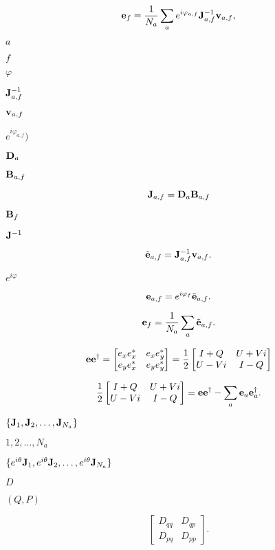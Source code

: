 \documentclass{article}
\begin{document}
\[ {\bf e}_f = \frac{1}{N_a} \sum_a e^{i\varphi_{a,f}} {\bf J}_{a,f}^{-1} {\bf v}_{a,f}, \]
\pagebreak

$a$
\pagebreak

$f$
\pagebreak

$\varphi$
\pagebreak

${\bf J}_{a,f}^{-1}$
\pagebreak

${\bf v}_{a,f}$
\pagebreak

$e^{i\varphi_{a,f}})$
\pagebreak

${\bf D}_a$
\pagebreak

${\bf B}_{a,f}$
\pagebreak

\[ {\bf J}_{a,f} = {\bf D}_a {\bf B}_{a,f} \]
\pagebreak

${\bf B}_f$
\pagebreak

${\bf J}^{-1}$
\pagebreak

\[ \tilde{\bf e}_{a,f} = {\bf J}^{-1}_{a,f} {\bf v}_{a,f}. \]
\pagebreak

$e^{i\varphi}$
\pagebreak

\[ {\bf e}_{a,f} = e^{i\varphi_f} \tilde{\bf e}_{a,f}. \]
\pagebreak

\[ {\bf e}_f = \frac{1}{N_a}\sum_a \tilde{\bf e}_{a,f}. \]
\pagebreak

\[ {\bf e}{\bf e}^\dagger = \begin{bmatrix} e_x e_x^\ast & e_x e_y^\ast \\ e_y e_x^\ast & e_y e_y^\ast \end{bmatrix} = \frac12 \begin{bmatrix} I + Q & U + Vi \\ U - Vi & I - Q \end{bmatrix} \]
\pagebreak

\[ \frac12 \begin{bmatrix} I + Q & U + Vi \\ U - Vi & I - Q \end{bmatrix} = {\bf e}{\bf e}^\dagger - \sum_a {\bf e}_a {\bf e}_a^\dagger. \]
\pagebreak

$\{{\bf J}_1, {\bf J}_2, \dots, {\bf J}_{N_a}\}$
\pagebreak

$1, 2, \dots, N_a$
\pagebreak

$\{e^{i\theta}{\bf J}_1, e^{i\theta}{\bf J}_2, \dots, e^{i\theta}{\bf J}_{N_a}\}$
\pagebreak

$D$
\pagebreak

$(Q,P)$
\pagebreak

\[\begin{bmatrix} D_{qq} & D_{qp} \\ D_{pq} & D_{pp} \end{bmatrix}.\]
\pagebreak
\end{document}

